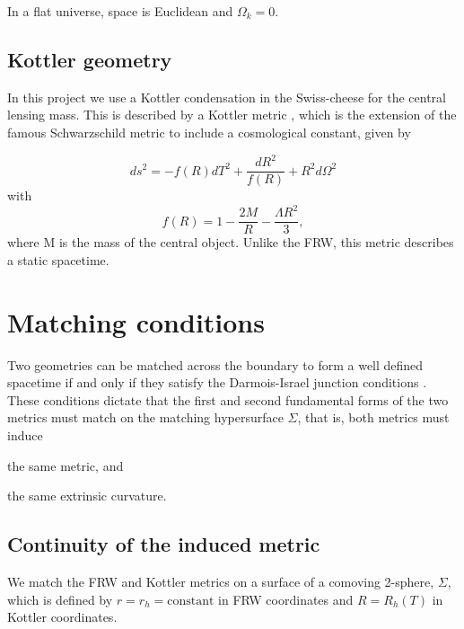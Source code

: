 In a flat universe, space is Euclidean and $\Omega_k = 0$. 


\subsection{Kottler geometry}

In this project we use a Kottler condensation in the Swiss-cheese for the central lensing mass. This is described by a Kottler metric \citep{kottler1918physikalischen}, which is the extension of the famous Schwarzschild metric to include a cosmological constant, given by

\begin{equation}
  ds^2 = -f(R)dT^2 + \frac{dR^2}{f(R)} + R^2 d \Omega^2
  \label{eq:kottler-metric}
\end{equation}
with
\begin{equation}
  f(R) = 1-\frac{2M}{R} - \frac{\Lambda R^2}{3},
  \label{eq:kottler-metric-f}
\end{equation}
where M is the mass of the central object. Unlike the FRW, this metric describes a static spacetime. 

\section{Matching conditions}

Two geometries can be matched across the boundary to form a well defined spacetime if and only if they satisfy the Darmois-Israel junction conditions \citep{darmois1927equations,israel1966singular}. These conditions dictate that the first and second fundamental forms of the two metrics must match on the matching hypersurface $\Sigma$, that is, both metrics must induce 
\begin{inparaenum}[(i)]
  \item the same metric, and 
  \item the same extrinsic curvature.
\end{inparaenum}

\subsection{Continuity of the induced metric}

We match the FRW and Kottler metrics on a surface of a comoving 2-sphere, $\Sigma$, which is defined by $r = r_h = \text{constant}$ in FRW coordinates and $R = R_h(T)$ in Kottler coordinates.

